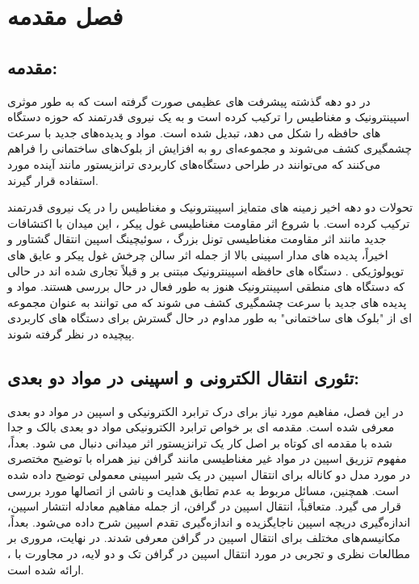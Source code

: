 ﻿\chapter{فصل مقدمه} 
\newpage
\section{مقدمه:}

در دو دهه گذشته پیشرفت های عظیمی صورت گرفته است که به طور موثری اسپینترونیک و مغناطیس را ترکیب کرده است و به یک نیروی قدرتمند که حوزه دستگاه های حافظه را شکل می دهد، تبدیل شده است. مواد و پدیده‌های جدید با سرعت چشمگیری کشف می‌شوند و مجموعه‌ای رو به افزایش از بلوک‌های ساختمانی را فراهم می‌کنند که می‌توانند در طراحی دستگاه‌های کاربردی ترانزیستور مانند آینده مورد استفاده قرار گیرند.

تحولات دو دهه اخیر زمینه های متمایز اسپینترونیک و مغناطیس را در یک نیروی قدرتمند ترکیب کرده است. با شروع اثر مقاومت مغناطیسی غول پیکر ، این میدان با اکتشافات جدید مانند اثر مقاومت مغناطیسی تونل بزرگ ، سوئیچینگ اسپین انتقال گشتاور  و اخیراً، پدیده های مدار اسپینی بالا از جمله اثر سالن چرخش غول پیکر  و عایق های توپولوژیکی .
دستگاه های حافظه اسپینترونیک مبتنی بر  و  قبلاً تجاری شده اند در حالی که دستگاه های منطقی اسپینترونیک هنوز به طور فعال در حال بررسی هستند. مواد و پدیده های جدید با سرعت چشمگیری کشف می شوند که می توانند به عنوان مجموعه ای از "بلوک های ساختمانی" به طور مداوم در حال گسترش برای دستگاه های کاربردی پیچیده در نظر گرفته شوند.

\section{تئوری انتقال الکترونی و اسپینی در مواد دو بعدی:}
در این فصل، مفاهیم مورد نیاز برای درک ترابرد الکترونیکی و اسپین در مواد دو بعدی معرفی شده است. مقدمه ای بر خواص ترابرد الکترونیکی مواد دو بعدی بالک و جدا شده با مقدمه ای کوتاه بر اصل کار یک ترانزیستور اثر میدانی دنبال می شود. بعداً، مفهوم تزریق اسپین در مواد غیر مغناطیسی مانند گرافن نیز همراه با توضیح مختصری در مورد مدل دو کاناله برای انتقال اسپین در یک شیر اسپینی معمولی توضیح داده شده است. همچنین، مسائل مربوط به عدم تطابق هدایت و  ناشی از اتصالها مورد بررسی قرار می گیرد. متعاقباً، انتقال اسپین در گرافن، از جمله مفاهیم معادله انتشار اسپین، اندازه‌گیری دریچه اسپین ناجایگزیده و اندازه‌گیری تقدم اسپین  شرح داده می‌شود. بعداً، مکانیسم‌های مختلف  برای انتقال اسپین در گرافن معرفی شدند. در نهایت، مروری بر مطالعات نظری و تجربی در مورد انتقال اسپین در گرافن تک و دو لایه، در مجاورت با ، ارائه شده است.

